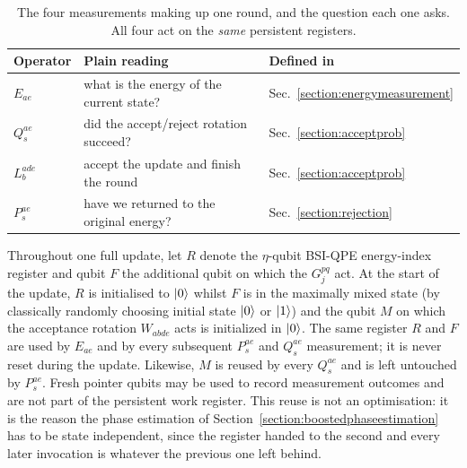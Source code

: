 \documentclass[aps,floatfix,10pt,amssymb,amsfont,amsmath,superscriptaddress,float,nofootinbib,longbibliography,nobalancelastpage,twocolumn]{revtex4-2}
\begin{document}
\begin{table}[b]
\caption{The four measurements making up one round, and the question each one asks. All four act on the \emph{same} persistent registers.}
\label{tab:operators}
\begin{ruledtabular}
\begin{tabular}{lll}
Operator & Plain reading & Defined in \\
\hline
$E_{ae}$ & what is the energy of the current state? & Sec.~\ref{section:energymeasurement}\\
$Q^{ae}_s$ & did the accept/reject rotation succeed? & Sec.~\ref{section:acceptprob}\\
$L^{ade}_b$ & accept the update and finish the round & Sec.~\ref{section:acceptprob}\\
$P^{ae}_s$ & have we returned to the original energy? & Sec.~\ref{section:rejection}\\
\end{tabular}
\end{ruledtabular}
\end{table}

Throughout one full update, let $R$ denote the $\eta$-qubit BSI-QPE energy-index register and qubit $F$ the additional qubit on which the $G_j^{pq}$ act. At the start of the update, $R$ is initialised to $\ket{0}$ whilst $F$ is in the maximally mixed state (by classically randomly choosing initial state $\ket{0}$ or $\ket{1}$) and the qubit $M$ on which the acceptance rotation $W_{abde}$ acts is initialized in $\ket{0}$. The same register $R$ and $F$ are used by $E_{ae}$ and by every subsequent $P_s^{ae}$ and $Q_s^{ae}$ measurement; it is never reset during the update. Likewise, $M$ is reused by every $Q_s^{ae}$ and is left untouched by $P_s^{ae}$. Fresh pointer qubits may be used to record measurement outcomes and are not part of the persistent work register. This reuse is not an optimisation: it is the reason the phase estimation of Section~\ref{section:boostedphaseestimation} has to be state independent, since the register handed to the second and every later invocation is whatever the previous one left behind.
\end{document}
